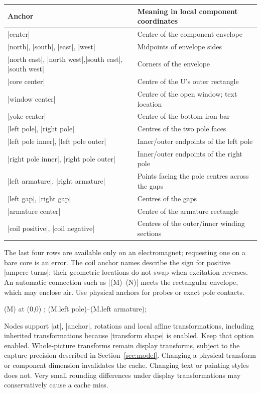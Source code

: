 \begin{center}
\begin{tabular}{p{.42\linewidth}p{.49\linewidth}}
\toprule Anchor & Meaning in local component coordinates \\
\midrule
|center| & Centre of the component envelope \\
|north|, |south|, |east|, |west| & Midpoints of envelope sides \\
|north east|, |north west|,\newline |south east|, |south west|
  & Corners of the envelope \\
|core center| & Centre of the U's outer rectangle \\
|window center| & Centre of the open window; text location \\
|yoke center| & Centre of the bottom iron bar \\
|left pole|, |right pole| & Centres of the two pole faces \\
|left pole inner|, |left pole outer| & Inner/outer endpoints of the left pole \\
|right pole inner|, |right pole outer| & Inner/outer endpoints of the right pole \\
|left armature|, |right armature| & Points facing the pole centres across the gaps \\
|left gap|, |right gap| & Centres of the gaps \\
|armature center| & Centre of the armature rectangle \\
|coil positive|, |coil negative| & Centres of the outer/inner winding sections \\
\bottomrule
\end{tabular}
\end{center}
The last four rows are available only on an electromagnet; requesting one on
a bare core is an error. The coil anchor names describe the sign for positive
|ampere turns|; their geometric locations do not swap when excitation reverses.
An automatic connection such as |(M)--(N)| meets the rectangular envelope,
which may enclose air. Use physical anchors for probes or exact pole contacts.

\begin{codeexample}
\node[femm/u electromagnet={gap=3,ampere turns=6000},
  anchor=left pole,rotate=20] (M) at (0,0) {};
\draw[femm/profile={name=left-gap,samples=101},red,dashed]
  (M.left pole)--(M.left armature);
\end{codeexample}

Nodes support |at|, |anchor|, rotations and local affine transformations,
including inherited transformations because |transform shape| is enabled.
Keep that option enabled. Whole-picture transforms remain display transforms,
subject to the capture precision described in Section~\ref{sec:model}.
Changing a physical transform or component dimension invalidates the cache.
Changing text or painting styles does not. Very small rounding differences
under display transformations may conservatively cause a cache miss.

